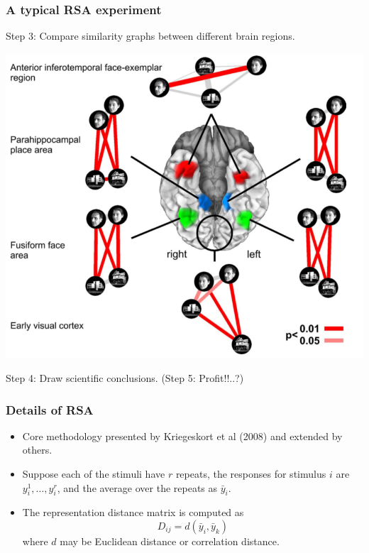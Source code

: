 \documentclass{beamer}
\begin{document}
\begin{frame}
\frametitle{A typical RSA experiment}
Step 3: Compare similarity graphs between different brain regions.
\begin{center}
\includegraphics[scale = 0.2]{k08_step3.png}
\end{center}
Step 4: Draw scientific conclusions.  (Step 5: Profit!!..?)
\end{frame}

\begin{frame}
\frametitle{Details of RSA}
\begin{itemize}
\item Core methodology presented by Kriegeskort et al (2008) and extended by others.
\item Suppose each of the stimuli have $r$ repeats, the responses for stimulus $i$ are $y_i^1,\hdots, y_i^r$,
and the average over the repeats as $\bar{y}_i$.
\item The representation distance matrix is computed as
\[
D_{ij} = d(\bar{y}_i, \bar{y}_k)
\] 
where $d$ may be Euclidean distance or correlation distance.
\end{itemize}
\end{frame}
\end{document}
